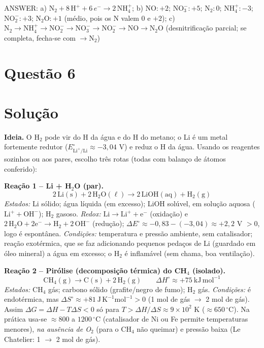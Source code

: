 \documentclass{article}%
\begin{document}
\medskip
ANSWER: a) $\mathrm{N_2} + 8\,\mathrm{H^+} + 6\,e^- \to 2\,\mathrm{NH_4^+}$; b) $\mathrm{NO}: +2$; $\mathrm{NO_3^-}: +5$; $\mathrm{N_2}: 0$; $\mathrm{NH_4^+}: -3$; $\mathrm{NO_2^-}: +3$; $\mathrm{N_2O}: +1$ (médio, pois os N valem $0$ e $+2$); c) $\mathrm{N_2} \to \mathrm{NH_4^+} \to \mathrm{NO_2^-} \to \mathrm{NO_3^-} \to \mathrm{NO_2^-} \to \mathrm{NO} \to \mathrm{N_2O}$ (desnitrificação parcial; se completa, fecha-se com $\to \mathrm{N_2}$)%
\newpage%
\section*{Questão 6}

\section*{Solução}

\textbf{Ideia.} O H$_2$ pode vir do H da água e do H do metano; o Li é um metal fortemente redutor ($E^\circ_{\mathrm{Li^+/Li}}\approx -3{,}04$ V) e reduz o H da água. Usando os reagentes sozinhos ou aos pares, escolho três rotas (todas com balanço de átomos conferido):

\medskip
\textbf{Reação 1 -- Li + H$_2$O (par).}
\[
2\,\mathrm{Li(s)} + 2\,\mathrm{H_2O(\ell)} \longrightarrow 2\,\mathrm{LiOH(aq)} + \mathrm{H_2(g)}
\]
\textit{Estados:} Li sólido; água líquida (em excesso); LiOH solúvel, em solução aquosa ($\mathrm{Li^+}+\mathrm{OH^-}$); H$_2$ gasoso.
\textit{Redox:} $\mathrm{Li\to Li^+ + e^-}$ (oxidação) e $2\,\mathrm{H_2O + 2e^- \to H_2 + 2\,OH^-}$ (redução); $\Delta E^\circ\approx -0{,}83-(-3{,}04)\approx +2{,}2$ V $>0$, logo é espontânea.
\textit{Condições:} temperatura e pressão ambiente, sem catalisador; reação exotérmica, que se faz adicionando pequenos pedaços de Li (guardado em óleo mineral) a água em excesso; o H$_2$ é inflamável (sem chama, boa ventilação).

\medskip
\textbf{Reação 2 -- Pirólise (decomposição térmica) do CH$_4$ (isolado).}
\[
\mathrm{CH_4(g)} \longrightarrow \mathrm{C(s)} + 2\,\mathrm{H_2(g)} \qquad \Delta H^\circ\approx +75\ \mathrm{kJ\,mol^{-1}}
\]
\textit{Estados:} CH$_4$ gás; carbono sólido (grafite/negro de fumo); H$_2$ gás.
\textit{Condições:} é endotérmica, mas $\Delta S^\circ\approx +81\ \mathrm{J\,K^{-1}mol^{-1}}>0$ (1 mol de gás $\to$ 2 mol de gás). Assim $\Delta G=\Delta H-T\Delta S<0$ só para $T>\Delta H/\Delta S\approx 9\times10^{2}$ K ($\approx 650\,^\circ$C). Na prática usa-se $\approx 800$ a $1200\,^\circ$C (catalisador de Ni ou Fe permite temperaturas menores), \emph{na ausência de O$_2$} (para o CH$_4$ não queimar) e pressão baixa (Le Chatelier: 1 $\to$ 2 mol de gás).
\end{document}
